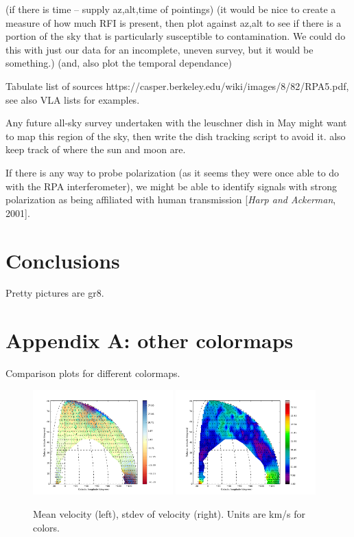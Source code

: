 \documentclass[10pt]{article}
\begin{document}
(if there is time -- supply az,alt,time of pointings)
(it would be nice to create a measure of how much RFI is present, then plot against az,alt to see if there is a portion of the sky that is particularly susceptible to contamination.  We could do this with just our data for an incomplete, uneven survey, but it would be something.)
(and, also plot the temporal dependance)

Tabulate list of sources
https://casper.berkeley.edu/wiki/images/8/82/RPA5.pdf, see also VLA lists for examples.

Any future all-sky survey undertaken with the leuschner dish in May might want to map this region of the sky, then write the dish tracking script to avoid it.  also keep track of where the sun and moon are.

If there is any way to probe polarization (as it seems they were once able to do with the RPA interferometer), we might be able to identify signals with strong polarization as being affiliated with human transmission [\textit{Harp and Ackerman}, 2001].

\section{Conclusions}

Pretty pictures are gr8.

\section{Appendix A: other colormaps}

Comparison plots for different colormaps.

\begin{figure}[!ht]
    \centering
    \includegraphics[width=0.48\textwidth]{v_ave_temporary.png}
    \includegraphics[width=0.48\textwidth]{v_std_temporary.png} \\
    \caption{Mean velocity (left), stdev of velocity (right).  Units are km/s for colors.}
    \label{fig:velocs_again}
\end{figure}
\end{document}
